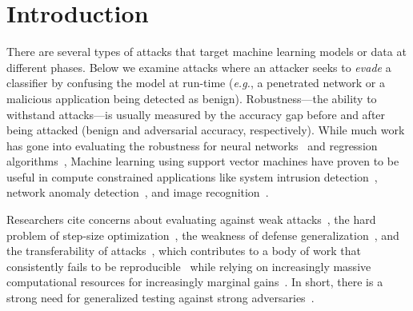 \documentclass[fonts]{icst}
\begin{document}

\maketitle



%



\section{Introduction}
There are several types of attacks that target machine learning models or data at different phases.
Below we examine attacks where an attacker seeks to \emph{evade} a classifier by confusing the model at run-time (\textit{e.g.}, a penetrated network or a malicious application being detected as benign).
Robustness---the ability to withstand attacks---is usually measured by the accuracy gap before and after being attacked (benign and adversarial accuracy, respectively).
While much work has gone into evaluating the robustness for neural networks~\cite{szegedy2013intriguing,madry2017towards,croce2020reliable} and regression algorithms~\cite{deka2019adversarial},
Machine learning using support vector machines have proven to be useful in compute constrained applications like system intrusion detection~\cite{kim2003network}, network anomaly detection~\cite{mehmood2015svm}, and image recognition~\cite{tzotsos2008support}.


Researchers cite concerns about evaluating against weak attacks~\cite{uesato2018adversarial,carlini2019evaluating}, the hard problem of step-size optimization~\cite{li2016general}, the weakness of defense generalization~\cite{stutz2019confidence}, and the transferability of attacks~\cite{demontis2019adversarial}, which contributes to a body of work that consistently fails to be reproducible~\cite{croce2020reliable} while  relying on increasingly massive computational resources for increasingly marginal gains~\cite{desislavov2021compute}.
In short, there is a strong need for generalized testing against strong adversaries~\cite{carlini2019evaluating}.
\end{document}

